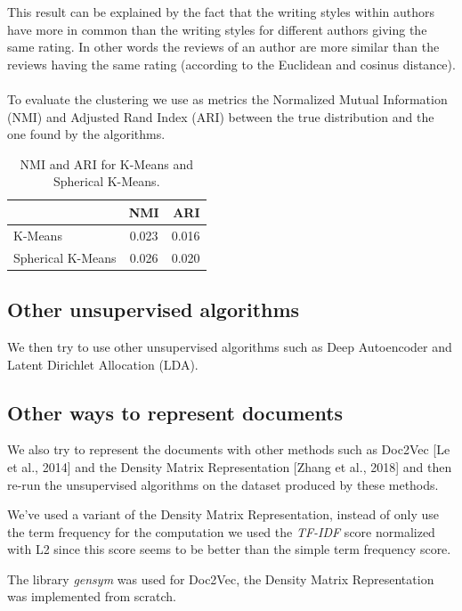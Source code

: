 \documentclass{article}
\begin{document}
This result can be explained by the fact that the writing styles within authors have more in common than the writing styles for different authors giving the same rating. In other words the reviews of an author are more similar than the reviews having the same rating (according to the Euclidean and cosinus distance).
\\\\
To evaluate the clustering we use as metrics the Normalized Mutual Information (NMI) and Adjusted Rand Index (ARI) between the true distribution and the one found by the algorithms.

\begin{table}[H] \label{tab:kmeans_nmi_ari}
\centering
\begin{tabular}{|l|c|r|}
  \hline
  & NMI & ARI \\
  \hline
  K-Means & 0.023 & 0.016 \\
  Spherical K-Means & 0.026 & 0.020 \\
  \hline
\end{tabular}
\caption{NMI and ARI for K-Means and Spherical K-Means.}
\end{table}



\subsection{Other unsupervised algorithms}

We then try to use other unsupervised algorithms such as Deep Autoencoder and Latent Dirichlet Allocation (LDA).



\subsection{Other ways to represent documents}

We also try to represent the documents with other methods such as Doc2Vec [Le et al., 2014] and the Density Matrix Representation [Zhang et al., 2018] and then re-run the unsupervised algorithms on the dataset produced by these methods.

We've used a variant of the Density Matrix Representation, instead of only use the term frequency for the computation we used the \textit{TF-IDF} score normalized with L2 since this score seems to be better than the simple term frequency score.

The library \textit{gensym} was used for Doc2Vec, the Density Matrix Representation was implemented from scratch.
\end{document}
